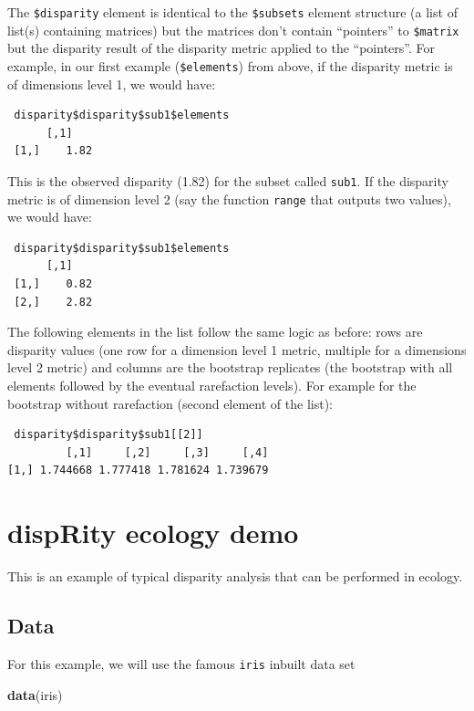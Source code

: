 \documentclass[
]{book}
\newenvironment{Shaded}{\begin{snugshade}}{\end{snugshade}}
\newcommand{\KeywordTok}[1]{\textcolor[rgb]{0.13,0.29,0.53}{\textbf{#1}}}
\newcommand{\NormalTok}[1]{#1}
\begin{document}
The \texttt{\$disparity} element is identical to the \texttt{\$subsets} element structure (a list of list(s) containing matrices) but the matrices don't contain ``pointers'' to \texttt{\$matrix} but the disparity result of the disparity metric applied to the ``pointers''.
For example, in our first example (\texttt{\$elements}) from above, if the disparity metric is of dimensions level 1, we would have:

\begin{verbatim}
 disparity$disparity$sub1$elements
      [,1]
 [1,]    1.82
\end{verbatim}

This is the observed disparity (1.82) for the subset called \texttt{sub1}.
If the disparity metric is of dimension level 2 (say the function \texttt{range} that outputs two values), we would have:

\begin{verbatim}
 disparity$disparity$sub1$elements
      [,1]
 [1,]    0.82
 [2,]    2.82
\end{verbatim}

The following elements in the list follow the same logic as before: rows are disparity values (one row for a dimension level 1 metric, multiple for a dimensions level 2 metric) and columns are the bootstrap replicates (the bootstrap with all elements followed by the eventual rarefaction levels).
For example for the bootstrap without rarefaction (second element of the list):

\begin{verbatim}
 disparity$disparity$sub1[[2]]
         [,1]     [,2]     [,3]     [,4]
[1,] 1.744668 1.777418 1.781624 1.739679 
\end{verbatim}

\hypertarget{disprity-ecology-demo}{%
\chapter{dispRity ecology demo}\label{disprity-ecology-demo}}

This is an example of typical disparity analysis that can be performed in ecology.

\hypertarget{data}{%
\section{Data}\label{data}}

For this example, we will use the famous \texttt{iris} inbuilt data set

\begin{Shaded}
\begin{Highlighting}[]
\KeywordTok{data}\NormalTok{(iris)}
\end{Highlighting}
\end{Shaded}
\end{document}
